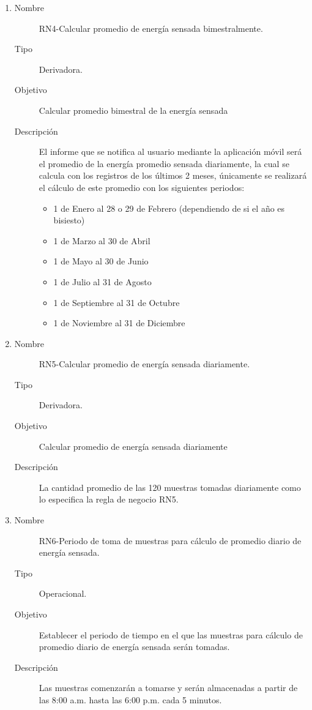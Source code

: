 \begin{enumerate}[label=RN\arabic*.]
\item \label{RN4}
		\begin{description}
			\item[Nombre] RN4-Calcular promedio de energía sensada bimestralmente.
			\item[Tipo] Derivadora.
			\item[Objetivo] Calcular promedio bimestral de la energía sensada
			\item[Descripción] El informe que se notifica al usuario mediante la aplicación móvil será el promedio de la energía promedio sensada diariamente, la cual se calcula con los registros de los últimos 2 meses, únicamente se realizará el cálculo de este promedio con los siguientes periodos:
			\begin{itemize}
				\item 1 de Enero al 28 o 29 de Febrero (dependiendo de si el año es bisiesto)
				\item 1 de Marzo al 30 de Abril
				\item 1 de Mayo al 30 de Junio
				\item 1 de Julio al 31 de Agosto
				\item 1 de Septiembre al 31 de Octubre
				\item 1 de Noviembre al 31 de Diciembre
			\end{itemize}
		\end{description}

\item \label{RN5}
		\begin{description}
			\item[Nombre] RN5-Calcular promedio de energía sensada diariamente.
			\item[Tipo] Derivadora.
			\item[Objetivo] Calcular promedio de energía sensada diariamente
			\item[Descripción] La cantidad promedio de las 120 muestras tomadas diariamente como lo especifica la regla de negocio RN5.
		\end{description}

\item \label{RN6}
		\begin{description}
			\item[Nombre] RN6-Periodo de toma de muestras para cálculo de promedio diario de energía sensada.
			\item[Tipo] Operacional.
			\item[Objetivo] Establecer el periodo de tiempo en el que las muestras para cálculo de promedio diario de energía sensada serán tomadas.
			\item[Descripción] Las muestras comenzarán a tomarse y serán almacenadas a partir de las 8:00 a.m. hasta las 6:00 p.m. cada 5 minutos.
		\end{description}
		

\end{enumerate}
